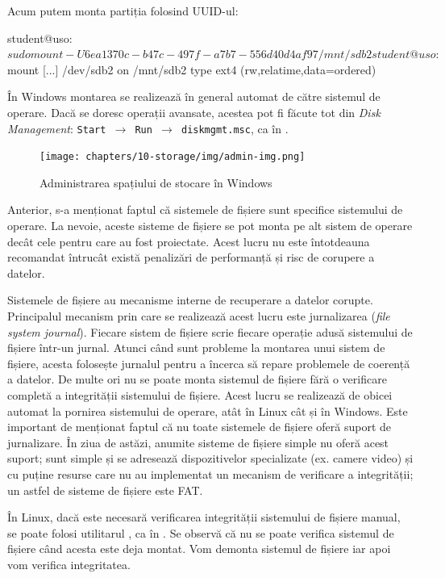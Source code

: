 Acum putem monta partiția folosind UUID-ul:

\begin{screen}
student@uso:~$ sudo mount -U 6ea1370c-b47c-497f-a7b7-556d40d4af97 /mnt/sdb2
student@uso:~$ mount
[...]
/dev/sdb2 on /mnt/sdb2 type ext4 (rw,relatime,data=ordered)
\end{screen}

În Windows montarea se realizează în general automat de către sistemul
de operare. Dacă se doresc operații avansate, acestea pot fi făcute tot din
\textit{Disk Management}: \texttt{Start $\rightarrow$ Run $\rightarrow$ diskmgmt.msc}, ca în .

\begin{figure}[!htbp]
  \centering
  \texttt{[image: chapters/10-storage/img/admin-img.png]}
  \caption{Administrarea spațiului de stocare în Windows}
  \label{fig:storage:win-disk-manage}
\end{figure}

Anterior, s-a menționat faptul că sistemele de fișiere sunt specifice sistemului
de operare. La nevoie, aceste sisteme de fișiere se pot monta pe alt sistem de
operare decât cele pentru care au fost proiectate. Acest lucru nu este
întotdeauna recomandat întrucât există penalizări de performanță și risc de
corupere a datelor.

Sistemele de fișiere au mecanisme interne de recuperare a datelor corupte.
Principalul mecanism prin care se realizează acest lucru este jurnalizarea (\textit{file
system journal}). Fiecare sistem de fișiere scrie fiecare operație adusă
sistemului de fișiere într-un jurnal. Atunci când sunt probleme la montarea unui
sistem de fișiere, acesta folosește jurnalul pentru a încerca să repare
problemele de coerență a datelor. De multe ori nu se poate monta sistemul de fișiere fără o
verificare completă a integrității sistemului de fișiere. Acest lucru se
realizează de obicei automat la pornirea sistemului de operare, atât în Linux
cât și în Windows. Este important de menționat faptul că nu toate sistemele de
fișiere oferă suport de jurnalizare. În ziua de astăzi, anumite sisteme de fișiere simple
nu oferă acest suport; sunt simple și se adresează dispozitivelor specializate (ex. camere video) și cu puține
resurse care nu au implementat un mecanism de verificare a integrității; un astfel de sisteme de fișiere este FAT.

În Linux, dacă este necesară verificarea integrității sistemului de fișiere
manual, se poate folosi utilitarul , ca în .
Se observă că nu se poate verifica sistemul de fișiere când acesta este deja montat. Vom demonta sistemul de fișiere iar apoi vom verifica integritatea.

